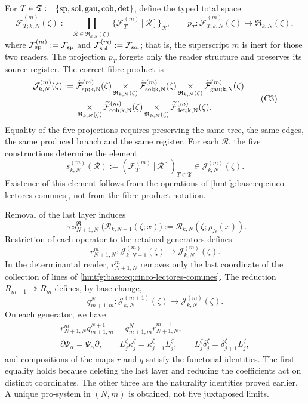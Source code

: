 For
\(T\in\mathfrak T:=\{{\rm sp},{\rm sol},{\rm gau},{\rm coh},{\rm det}\}\),
define the typed total space
\[
 \widetilde{\mathcal F}_{T;k,N}^{(m)}(\zeta)
 :=\coprod_{\mathscr R\in\mathfrak R_{k,N}(\zeta)}
   \{\mathcal F_T^{(m)}[\mathscr R]\}_{\mathscr R},
 \qquad
 p_T:\widetilde{\mathcal F}_{T;k,N}^{(m)}(\zeta)
      \longrightarrow\mathfrak R_{k,N}(\zeta),
\]
where
\(\mathcal F_{\rm sp}^{(m)}:=\mathcal F_{\rm sp}\) and
\(\mathcal F_{\rm sol}^{(m)}:=\mathcal F_{\rm sol}\); that is, the
superscript \(m\) is inert for those two readers.
The projection \(p_T\) forgets only the reader structure and preserves
its source register. The correct fibre product is
\[
\begin{aligned}
 \mathcal J_{k,N}^{(m)}(\zeta):={}&
 \widetilde{\mathcal F}_{\rm sp;k,N}^{(m)}(\zeta)
 \mathop{\times}_{\mathfrak R_{k,N}(\zeta)}
 \widetilde{\mathcal F}_{\rm sol;k,N}^{(m)}(\zeta)
 \mathop{\times}_{\mathfrak R_{k,N}(\zeta)}
 \widetilde{\mathcal F}_{\rm gau;k,N}^{(m)}(\zeta)\\
 &\mathop{\times}_{\mathfrak R_{k,N}(\zeta)}
 \widetilde{\mathcal F}_{\rm coh;k,N}^{(m)}(\zeta)
 \mathop{\times}_{\mathfrak R_{k,N}(\zeta)}
 \widetilde{\mathcal F}_{\rm det;k,N}^{(m)}(\zeta).
\end{aligned}
\tag{C3}
\label{hmtfg:base:eq:constructor-correlativo}
\]
Equality of the five projections requires preserving the same tree, the
same edges, the same produced branch and the same register. For each
\(\mathscr R\), the five constructions determine the element
\[
 s_{k,N}^{(m)}(\mathscr R)
 :=(\mathcal F_T^{(m)}[\mathscr R])_{T\in\mathfrak T}
 \in\mathcal J_{k,N}^{(m)}(\zeta).
\]
Existence of this element follows from the operations of
\eqref{hmtfg:base:eq:cinco-lectores-comunes}, not from the
fibre-product notation.

Removal of the last layer induces
\[
 \operatorname{res}^{\mathfrak R}_{N+1,N}
 \bigl(\mathscr R_{k,N+1}(\zeta;x)\bigr)
 :=\mathscr R_{k,N}(\zeta;\rho_N(x)).
\]
Restriction of each operator to the retained generators defines
\[
 r^m_{N+1,N}:\mathcal J_{k,N+1}^{(m)}(\zeta)
 \longrightarrow\mathcal J_{k,N}^{(m)}(\zeta).
\]
In the determinantal reader, \(r^m_{N+1,N}\) removes only the last coordinate of the collection of lines of \eqref{hmtfg:base:eq:cinco-lectores-comunes}. The reduction \(R_{m+1}\twoheadrightarrow R_m\) defines, by base change,
\[
 q^N_{m+1,m}:\mathcal J_{k,N}^{(m+1)}(\zeta)
 \longrightarrow\mathcal J_{k,N}^{(m)}(\zeta).
\]
On each generator, we have
\[
\begin{gathered}
 r^m_{N+1,N}q^{N+1}_{m+1,m}
 =q^N_{m+1,m}r^{m+1}_{N+1,N},\\
 \partial\Psi_\alpha=\Psi_\alpha\partial,
 \qquad L_j^\zeta\kappa_j^\zeta
       =\kappa_{j+1}^\zeta L_j^\zeta,
 \qquad L_j^\zeta\delta_j^\zeta
       =\delta_{j+1}^\zeta L_j^\zeta,
\end{gathered}
\tag{C4}
\label{hmtfg:base:eq:naturalidad-D}
\]
and compositions of the maps \(r\) and \(q\) satisfy the functorial
identities. The first equality holds because deleting the last layer and
reducing the coefficients act on distinct coordinates. The other three
are the naturality identities proved earlier. A unique
pro-system in \((N,m)\) is obtained, not five juxtaposed limits.

